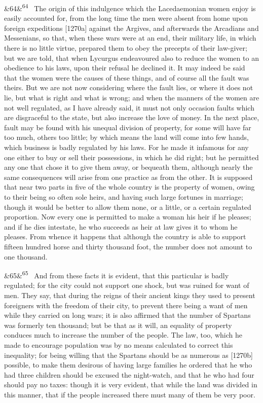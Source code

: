 \documentclass[12pt]{article}
\newcommand{\para}[1][]{\par\noindent\ifx&#1&\else\textsuperscript{\footnotesize #1}~\fi}
\begin{document}
\para[64] The origin of this indulgence which the Lacedaemonian women enjoy is easily accounted for, from the long time the men were absent from home upon foreign expeditions [1270a] against the Argives, and afterwards the Arcadians and Messenians, so that, when these wars were at an end, their military life, in which there is no little virtue, prepared them to obey the precepts of their law-giver; but we are told, that when Lycurgus endeavoured also to reduce the women to an obedience to his laws, upon their refusal he declined it. It may indeed be said that the women were the causes of these things, and of course all the fault was theirs. But we are not now considering where the fault lies, or where it does not lie, but what is right and what is wrong; and when the manners of the women are not well regulated, as I have already said, it must not only occasion faults which are disgraceful to the state, but also increase the love of money. In the next place, fault may be found with his unequal division of property, for some will have far too much, others too little; by which means the land will come into few hands, which business is badly regulated by his laws. For he made it infamous for any one either to buy or sell their possessions, in which he did right; but he permitted any one that chose it to give them away, or bequeath them, although nearly the same consequences will arise from one practice as from the other. It is supposed that near two parts in five of the whole country is the property of women, owing to their being so often sole heirs, and having such large fortunes in marriage; though it would be better to allow them none, or a little, or a certain regulated proportion. Now every one is permitted to make a woman his heir if he pleases; and if he dies intestate, he who succeeds as heir at law gives it to whom he pleases. From whence it happens that although the country is able to support fifteen hundred horse and thirty thousand foot, the number does not amount to one thousand.

\para[65] And from these facts it is evident, that this particular is badly regulated; for the city could not support one shock, but was ruined for want of men. They say, that during the reigns of their ancient kings they used to present foreigners with the freedom of their city, to prevent there being a want of men while they carried on long wars; it is also affirmed that the number of Spartans was formerly ten thousand; but be that as it will, an equality of property conduces much to increase the number of the people. The law, too, which he made to encourage population was by no means calculated to correct this inequality; for being willing that the Spartans should be as numerous as [1270b] possible, to make them desirous of having large families he ordered that he who had three children should be excused the night-watch, and that he who had four should pay no taxes: though it is very evident, that while the land was divided in this manner, that if the people increased there must many of them be very poor.
\end{document}
